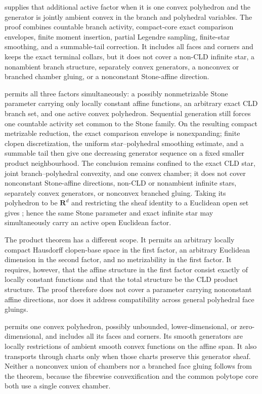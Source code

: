 \begin{remark}
 supplies that additional
active factor when it is one convex polyhedron and the generator is jointly
ambient convex in the branch and polyhedral variables.  The proof combines
countable branch activity, compact-core exact comparison envelopes, finite
moment insertion, partial Legendre sampling, finite-star smoothing, and a
summable-tail correction.  It includes all faces and corners and keeps the
exact terminal collars, but it does not cover a non-CLD infinite star, a
nonambient branch structure, separately convex generators, a nonconvex or
branched chamber gluing, or a nonconstant Stone-affine direction.

 permits all three
factors simultaneously: a possibly nonmetrizable Stone parameter carrying
only locally constant affine functions, an arbitrary exact CLD branch set,
and one active convex polyhedron.  Sequential generation still forces one
countable activity set common to the Stone family.  On the resulting compact
metrizable reduction, the exact comparison envelope is nonexpanding; finite
clopen discretization, the uniform star--polyhedral smoothing estimate, and
a summable tail then give one decreasing generator sequence on a fixed
smaller product neighbourhood.  The conclusion remains confined to the
exact CLD star, joint branch--polyhedral convexity, and one convex chamber;
it does not cover nonconstant Stone-affine directions, non-CLD or nonambient
infinite stars, separately convex generators, or nonconvex branched gluing.
Taking its polyhedron to be $\mathbf R^d$ and restricting the sheaf identity
to a Euclidean open set gives
; hence the same Stone
parameter and exact infinite star may simultaneously carry an active open
Euclidean factor.

The product theorem
 has a different scope.  It permits
an arbitrary locally compact Hausdorff clopen-base space in the first
factor, an arbitrary Euclidean dimension in the second factor, and no
metrizability in the first factor.  It requires, however, that the affine
structure in the first factor consist exactly of locally constant
functions and that the total structure be the CLD product structure.  The
proof therefore does not cover a parameter carrying nonconstant affine
directions, nor does it address compatibility across general polyhedral
face gluings.

 permits one convex polyhedron,
possibly unbounded, lower-dimensional, or zero-dimensional, and includes
all its faces and corners.  Its smooth generators are locally restrictions
of ambient smooth convex functions on the affine span.  It also transports
through charts only when those charts preserve this generator sheaf.
Neither a nonconvex union of chambers nor a branched face gluing follows
from the theorem, because the fibrewise convexification and the common
polytope core both use a single convex chamber.


\end{remark}
